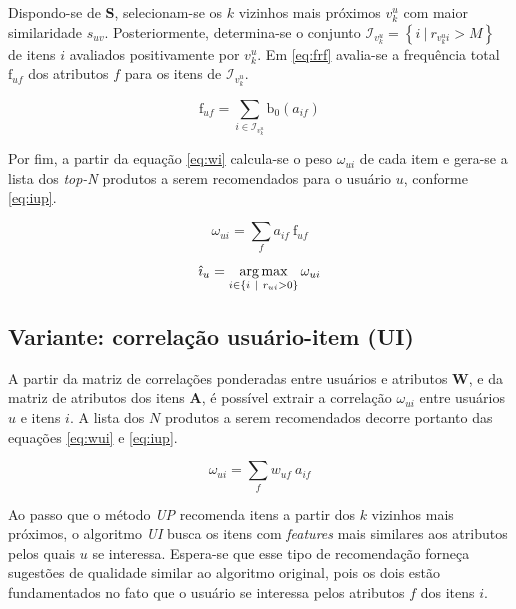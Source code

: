 Dispondo-se de $\mathbf{S}$, selecionam-se os $k$ vizinhos mais próximos $v_k^u$ com maior similaridade $s_{uv}$.  Posteriormente, determina-se o conjunto $\mathcal{I}_{v_k^u} = \left\{ i ~|~ r_{v_k^u i} > M\right\}$ de itens $i$ avaliados positivamente por $v_k^u$. Em \ref{eq:frf} avalia-se a frequência total $\mathrm{f}_{uf}$ dos atributos $f$ para os itens de $\mathcal{I}_{v_k^u}$. 

\begin{equation}
\label{eq:frf} 
\mathrm{f}_{uf} = \sum_{i \in \mathcal{I}_{v_k^u}}{\mathrm{b}_0\left(a_{if}\right)}
\end{equation} 

Por fim, a partir da equação \ref{eq:wi} calcula-se o peso $\omega_{ui}$ de cada item e gera-se a lista dos \textit{top-N} produtos a serem recomendados para o usuário $u$, conforme \ref{eq:iup}. 

\begin{equation}
\label{eq:wi} 
    \omega_{ui} = \sum_{f}{a_{if}~\mathrm{f}_{uf}}
\end{equation} 

\begin{equation}
\label{eq:iup} 
    \hat{\imath}_u = \operatorname*{arg\,max}_{i \in \left\{i~|~r_{ui} > 0\right\}}{\omega_{ui}}
\end{equation} 

\subsection{Variante: correlação usuário-item (UI)} %
\label{sub:variante_correla_o_usu_rio_item_}

A partir da matriz de correlações ponderadas entre usuários e atributos $\mathbf{W}$, e da matriz de atributos dos itens $\mathbf{A}$, é possível extrair a correlação $\omega_{ui}$ entre usuários $u$ e itens $i$. A lista dos $N$ produtos a serem recomendados decorre portanto das equações \ref{eq:wui} e \ref{eq:iup}.

\begin{equation}
\label{eq:wui} 
    \omega_{ui} = \sum_{f}{w_{uf}~a_{if}}
\end{equation} 

Ao passo que o método \textit{UP} recomenda itens a partir dos $k$ vizinhos mais próximos, o algoritmo \textit{UI} busca os itens com \textit{features} mais similares aos atributos pelos quais $u$ se interessa. Espera-se que esse tipo de recomendação forneça sugestões de qualidade similar ao algoritmo original, pois os dois estão fundamentados no fato que o usuário se interessa pelos atributos $f$ dos itens $i$. 


